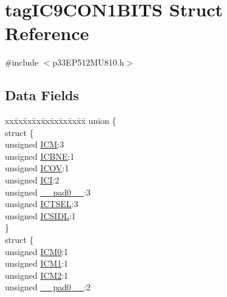 \hypertarget{structtag_i_c9_c_o_n1_b_i_t_s}{}\section{tag\+I\+C9\+C\+O\+N1\+B\+I\+TS Struct Reference}
\label{structtag_i_c9_c_o_n1_b_i_t_s}


{\ttfamily \#include $<$p33\+E\+P512\+M\+U810.\+h$>$}

\subsection*{Data Fields}
\begin{DoxyCompactItemize}
\item 
\begin{tabbing}
xx\=xx\=xx\=xx\=xx\=xx\=xx\=xx\=xx\=\kill
union \{\\
\>struct \{\\
\>\>unsigned \hyperlink{structtag_i_c9_c_o_n1_b_i_t_s_ad3edde44ecb2d349ffa2decd0a251c20}{ICM}:3\\
\>\>unsigned \hyperlink{structtag_i_c9_c_o_n1_b_i_t_s_a824e7dcca83939e1b049d63ffcee33e9}{ICBNE}:1\\
\>\>unsigned \hyperlink{structtag_i_c9_c_o_n1_b_i_t_s_a49392949376ba0bf58cf8db889e86c94}{ICOV}:1\\
\>\>unsigned \hyperlink{structtag_i_c9_c_o_n1_b_i_t_s_a72486dcb868aad2d5c978494691356cc}{ICI}:2\\
\>\>unsigned \hyperlink{structtag_i_c9_c_o_n1_b_i_t_s_adf71f3d8410c1f1dbbc96680a92c49af}{\_\_pad0\_\_}:3\\
\>\>unsigned \hyperlink{structtag_i_c9_c_o_n1_b_i_t_s_a7a9dd41b5f93eb620df7fa336e452677}{ICTSEL}:3\\
\>\>unsigned \hyperlink{structtag_i_c9_c_o_n1_b_i_t_s_af441b36127c0bb7a35162dfc9a64103c}{ICSIDL}:1\\
\>\} \\
\>struct \{\\
\>\>unsigned \hyperlink{structtag_i_c9_c_o_n1_b_i_t_s_a649b1dd9bca75e558f37a9f52a829bd4}{ICM0}:1\\
\>\>unsigned \hyperlink{structtag_i_c9_c_o_n1_b_i_t_s_af3fe77ef9f8ca41ff11519f445e7bc77}{ICM1}:1\\
\>\>unsigned \hyperlink{structtag_i_c9_c_o_n1_b_i_t_s_a3c62c9cbbc3a406402126c932b709db8}{ICM2}:1\\
\>\>unsigned \hyperlink{structtag_i_c9_c_o_n1_b_i_t_s_adf71f3d8410c1f1dbbc96680a92c49af}{\_\_pad0\_\_}:2\\

\end{tabbing}
\end{DoxyCompactItemize}
